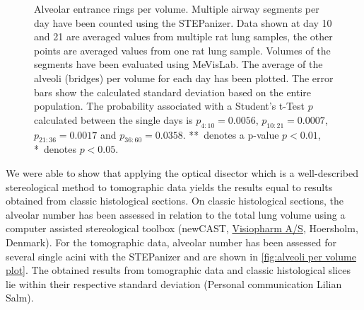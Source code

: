 \begin{figure}[htb]%
	\centering
	\caption[Alveolar entrance rings per volume]{Alveolar entrance rings per volume. Multiple airway segments per day have been counted using the STEPanizer. Data shown at day 10 and 21 are averaged values from multiple rat lung samples, the other points are averaged values from one rat lung sample. Volumes of the segments have been evaluated using MeVisLab. The average of the alveoli (bridges) per volume for each day has been plotted. The error bars show the calculated standard deviation based on the entire population. The probability associated with a Student's t-Test $p$ calculated between the single days is $p_{4:10}=0.0056$, $p_{10:21}=0.0007$, $p_{21:36}=0.0017$ and $p_{36:60}=0.0358$. **~denotes a p-value $p<0.01$, *~denotes $p<0.05$.}
	\label{fig:alveoli per volume plot}
\end{figure}%

We were able to show that applying the optical disector \cite{Sterio1984,Hsia2010} which is a well-described stereological method to tomographic data yields the results equal to results obtained from classic histological sections. On classic histological sections, the alveolar number has been assessed in relation to the total lung volume using a computer assisted stereological toolbox (newCAST, \href{http://visiopharm.com/}{Visiopharm A/S}, Hoersholm, Denmark). For the tomographic data, alveolar number has been assessed for several single acini with the STEPanizer and are shown in \autoref{fig:alveoli per volume plot}. The obtained results from tomographic data and classic histological slices lie within their respective standard deviation (Personal communication Lilian Salm).

